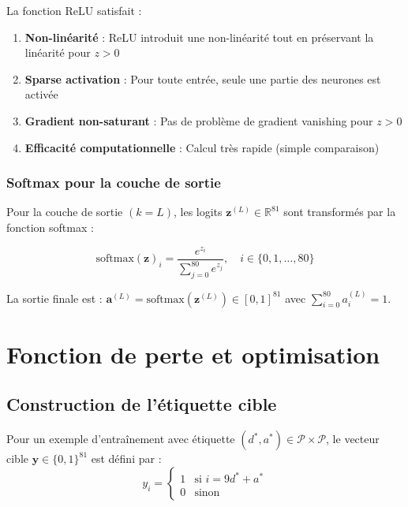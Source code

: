 \documentclass[12pt,a4paper]{report}
\numberwithin{equation}{section}
\begin{document}
\begin{theorem}
La fonction ReLU satisfait :
\begin{enumerate}
  \item \textbf{Non-linéarité} : ReLU introduit une non-linéarité tout en préservant la linéarité pour $z > 0$
  \item \textbf{Sparse activation} : Pour toute entrée, seule une partie des neurones est activée
  \item \textbf{Gradient non-saturant} : Pas de problème de gradient vanishing pour $z > 0$
  \item \textbf{Efficacité computationnelle} : Calcul très rapide (simple comparaison)
\end{enumerate}
\end{theorem}

\subsection{Softmax pour la couche de sortie}

Pour la couche de sortie $(k = L)$, les logits $\mathbf{z}^{(L)} \in \mathbb{R}^{81}$ sont transformés par la fonction softmax :

\begin{definition}
$$\text{softmax}(\mathbf{z})_i = \frac{e^{z_i}}{\sum_{j=0}^{80} e^{z_j}}, \quad i \in \{0, 1, \ldots, 80\}$$
\end{definition}

La sortie finale est : $\mathbf{a}^{(L)} = \text{softmax}(\mathbf{z}^{(L)}) \in [0,1]^{81}$ avec $\sum_{i=0}^{80} a^{(L)}_i = 1$.

\chapter{Fonction de perte et optimisation}

\section{Construction de l'étiquette cible}

\begin{definition}
Pour un exemple d'entraînement avec étiquette $(d^*, a^*) \in \mathcal{P} \times \mathcal{P}$, le vecteur cible $\mathbf{y} \in \{0,1\}^{81}$ est défini par :
$$y_i = \begin{cases}
1 & \text{si } i = 9d^* + a^*\\
0 & \text{sinon}
\end{cases}$$
\end{definition}
\end{document}
